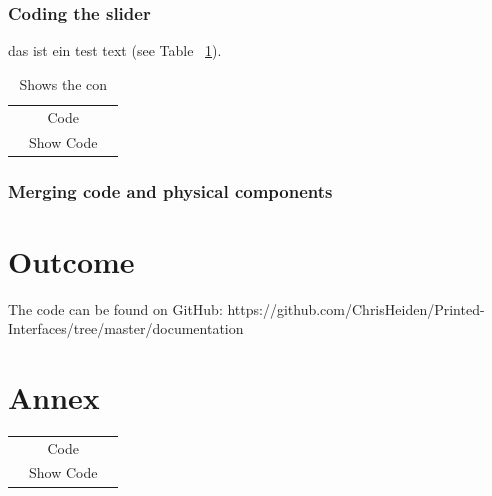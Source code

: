 \documentclass[12pt,twoside,a4paper]{article}
\begin{document}
    \subsubsection{Coding the slider}
        \begin{flushleft}
        das ist ein test text (see Table ~\ref{tab:test}).\newline
        \end{flushleft}

        \begin{table}[h]
            \centering
            \begin{tabular}[h]{ccc}
                & Code &  \\
                & Show Code &  \\
            \end{tabular}
            \caption{Shows the con}
            \label{tab:test}
        \end{table}
        \begin{flushleft}
        \end{flushleft}


    \subsubsection{Merging code and physical components}
        \begin{flushleft}
        \end{flushleft}

    \section{Outcome}
        \begin{flushleft}

            The code can be found on GitHub: https://github.com/ChrisHeiden/Printed-Interfaces/tree/master/documentation %
        \end{flushleft}
        
    \newpage
     
    

    \newpage
    \section{Annex}

        \begin{tabular}[h]{ccc}
            & Code &  \\
            & Show Code &  \\
        \end{tabular}
\end{document}
